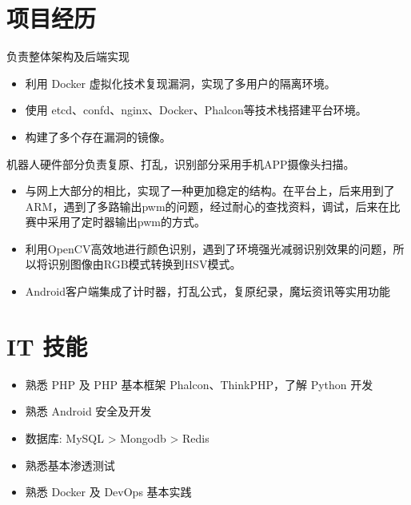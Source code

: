 \documentclass{resume}
\begin{document}
\pagestyle{empty}

\section{项目经历}
\begin{onehalfspacing}
负责整体架构及后端实现
\begin{itemize}
  \item 利用 Docker 虚拟化技术复现漏洞，实现了多用户的隔离环境。
  \item 使用 etcd、confd、nginx、Docker、Phalcon等技术栈搭建平台环境。
  \item 构建了多个存在漏洞的镜像。
\end{itemize}
\end{onehalfspacing}

\begin{onehalfspacing}
机器人硬件部分负责复原、打乱，识别部分采用手机APP摄像头扫描。
\begin{itemize}
  \item 与网上大部分的相比，实现了一种更加稳定的结构。在平台上，后来用到了ARM，遇到了多路输出pwm的问题，经过耐心的查找资料，调试，后来在比赛中采用了定时器输出pwm的方式。
  \item 利用OpenCV高效地进行颜色识别，遇到了环境强光减弱识别效果的问题，所以将识别图像由RGB模式转换到HSV模式。
  \item Android客户端集成了计时器，打乱公式，复原纪录，魔坛资讯等实用功能
\end{itemize}
\end{onehalfspacing}

\section{IT 技能}
\begin{onehalfspacing}
\begin{itemize}[parsep=0.5ex]
  \item 熟悉 PHP 及 PHP 基本框架 Phalcon、ThinkPHP，了解 Python 开发
  \item 熟悉 Android 安全及开发
  \item 数据库: MySQL > Mongodb > Redis
  \item 熟悉基本渗透测试
  \item 熟悉 Docker 及 DevOps 基本实践
\end{itemize}
\end{onehalfspacing}
\end{document}

